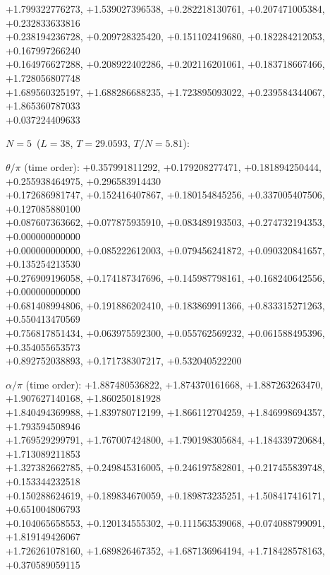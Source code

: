 \begin{flushleft}
+1.799322776273, +1.539027396538, +0.282218130761, +0.207471005384, +0.232833633816 \\
+0.238194236728, +0.209728325420, +0.151102419680, +0.182284212053, +0.167997266240 \\
+0.164976627288, +0.208922402286, +0.202116201061, +0.183718667466, +1.728056807748 \\
+1.689560325197, +1.688286688235, +1.723895093022, +0.239584344067, +1.865360787033 \\
+0.037224409633
\vspace{3pt}\par\noindent\textbf{$N=5$}\ ($L=38$, $T=29.0593$, $T/N=5.81$):
\par\noindent$\theta/\pi$ (time order):
+0.357991811292, +0.179208277471, +0.181894250444, +0.255938464975, +0.296583914430 \\
+0.172686981747, +0.152416407867, +0.180154845256, +0.337005407506, +0.127085880100 \\
+0.087607363662, +0.077875935910, +0.083489193503, +0.274732194353, +0.000000000000 \\
+0.000000000000, +0.085222612003, +0.079456241872, +0.090320841657, +0.135254213530 \\
+0.276909196058, +0.174187347696, +0.145987798161, +0.168240642556, +0.000000000000 \\
+0.681408994806, +0.191886202410, +0.183869911366, +0.833315271263, +0.550413470569 \\
+0.756817851434, +0.063975592300, +0.055762569232, +0.061588495396, +0.354055653573 \\
+0.892752038893, +0.171738307217, +0.532040522200
\par\noindent$\alpha/\pi$ (time order):
+1.887480536822, +1.874370161668, +1.887263263470, +1.907627140168, +1.860250181928 \\
+1.840494369988, +1.839780712199, +1.866112704259, +1.846998694357, +1.793594508946 \\
+1.769529299791, +1.767007424800, +1.790198305684, +1.184339720684, +1.713089211853 \\
+1.327382662785, +0.249845316005, +0.246197582801, +0.217455839748, +0.153344232518 \\
+0.150288624619, +0.189834670059, +0.189873235251, +1.508417416171, +0.651004806793 \\
+0.104065658553, +0.120134555302, +0.111563539068, +0.074088799091, +1.819149426067 \\
+1.726261078160, +1.689826467352, +1.687136964194, +1.718428578163, +0.370589059115 \\

\end{flushleft}
